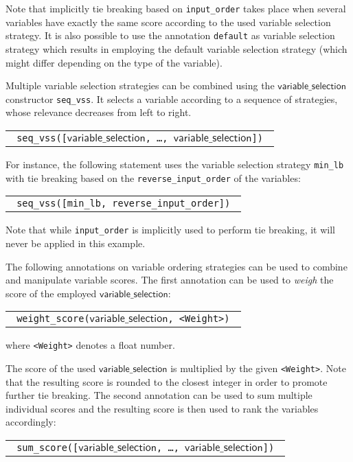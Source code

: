 \documentclass[a4paper]{article}
\newcommand{\fz}[1]{\texttt{#1}}
\newcommand{\fzsf}[1]{\ensuremath{\mathsf{#1}}}
\newcommand{\fzvarchoiceannotation}{\fzsf{variable\_selection}}
\begin{document}
Note that implicitly tie breaking based on \texttt{input\_order} takes place when several variables have exactly the same score according to the used variable selection strategy. It is also possible to use the annotation \texttt{default}
as variable selection strategy which results in employing the default 
variable selection strategy  (which might differ depending on the type of the variable).

Multiple variable selection strategies can be combined using the \fz{\fzvarchoiceannotation} constructor \texttt{seq\_vss}. It selects a variable according to a sequence of strategies, whose relevance decreases from left to right. 

\begin{tabular}{l}
\fz{
seq\_vss([\fzvarchoiceannotation, \ldots, \fzvarchoiceannotation])
}
\end{tabular}

For instance, the following statement uses the variable selection strategy \texttt{min\_lb} with tie breaking based on the \texttt{reverse\_input\_order} of the variables:

\begin{tabular}{l}
\fz{
seq\_vss([min\_lb, reverse\_input\_order])
}
\end{tabular}

Note that while \texttt{input\_order} is implicitly used to perform tie breaking, it will never be applied in this example.
 
The following annotations on variable ordering strategies can be used to 
combine and manipulate variable scores. 
The first annotation can be used to \emph{weigh} the score of the employed  \fzvarchoiceannotation:

\begin{tabular}{l}
\fz{
weight\_score(\fzvarchoiceannotation, <Weight>)
}
\end{tabular}
where \texttt{<Weight>} denotes a float number.

The score of the used  \fz{\fzvarchoiceannotation} is multiplied by the given \texttt{<Weight>}. Note that the resulting score is rounded to the closest integer in order to promote further tie breaking.
The second annotation can be used to sum multiple individual scores and the resulting score is
then used to rank the variables accordingly:

\begin{tabular}{l}
\fz{
sum\_score([\fzvarchoiceannotation, \ldots, \fzvarchoiceannotation])
}
\end{tabular}
\end{document}
